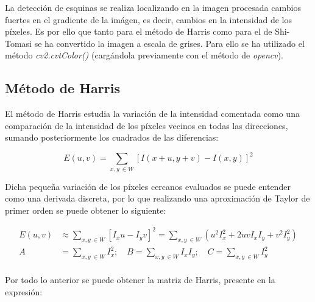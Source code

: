 \documentclass[a4paper,12pt]{article}
\begin{document}
{\begin{figure}[h!]
\end{figure}

\vspace{0.5cm}

La detección de esquinas se realiza localizando en la imagen procesada cambios fuertes en el gradiente de la imágen, es decir, cambios en la intensidad de los píxeles.
Es por ello que tanto para el método de Harris como para el de Shi-Tomasi se ha convertido la imagen a escala de grises. Para ello se ha utilizado el método \textit{cv2.cvtColor()}
(cargándola previamente con el método de \textit{opencv}).

\newpage


\subsection{Método de Harris}

\vspace{0.5cm}

El método de Harris estudia la variación de la intensidad comentada como una comparación de la intensidad de los píxeles vecinos en todas las direcciones, sumando 
posteriormente los cuadrados de las diferencias:

\vspace{0.5cm}

\begin{equation}
    E(u,v) = \sum_{x,y \ \in W} [I(x+u, y+v) - I(x,y)]^2
\end{equation}

\vspace{0.5cm}

Dicha pequeña variación de los píxeles cercanos evaluados se puede entender como una derivada discreta, por lo que realizando una aproximación de Taylor de primer orden
se puede obtener lo siguiente:

\vspace{0.5cm}

\[
\begin{aligned}
    E(u,v) &\approx \sum_{x,y \ \in W} [I_xu - I_yv]^2 = \sum_{x,y \ \in W}(u^2I_x^2 + 2uvI_xI_y + v^2I_y^2) \\
    A &= \sum_{x,y \ \in W} I_x^2; \quad B = \sum_{x,y \ \in W} I_xI_y; \quad C = \sum_{x,y \ \in W} I_y^2 \\
\end{aligned}
\]

\vspace{0.5cm}

Por todo lo anterior se puede obtener la matriz de Harris, presente en la expresión:

}
\end{document}

